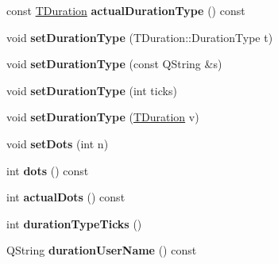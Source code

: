 \begin{DoxyCompactItemize}
\mbox{\label{class_ms_1_1_chord_rest_a6802d9faa8168c8425b8dcb3d11d2edb}} 
const \hyperlink{class_ms_1_1_t_duration}{T\+Duration} {\bfseries actual\+Duration\+Type} () const
\item 
\mbox{\label{class_ms_1_1_chord_rest_adc6b9aa10c0b149eea492432ceeb3ce3}} 
void {\bfseries set\+Duration\+Type} (T\+Duration\+::\+Duration\+Type t)
\item 
\mbox{\label{class_ms_1_1_chord_rest_a24a3f9e86372a2a3285bbcc4da63e741}} 
void {\bfseries set\+Duration\+Type} (const Q\+String \&s)
\item 
\mbox{\label{class_ms_1_1_chord_rest_a0ca27e9601ab0b09bc923c8b804c15a2}} 
void {\bfseries set\+Duration\+Type} (int ticks)
\item 
\mbox{\label{class_ms_1_1_chord_rest_a557b205722fc2931c9113f5afa6f5f48}} 
void {\bfseries set\+Duration\+Type} (\hyperlink{class_ms_1_1_t_duration}{T\+Duration} v)
\item 
\mbox{\label{class_ms_1_1_chord_rest_a3b39d7d2e1b2c2f11ea0d3522af684af}} 
void {\bfseries set\+Dots} (int n)
\item 
\mbox{\label{class_ms_1_1_chord_rest_a1ebb74b05f781c56e63bbc5ff221d7f3}} 
int {\bfseries dots} () const
\item 
\mbox{\label{class_ms_1_1_chord_rest_a3f2d1ebbf74d49882a656ae4ba4b4389}} 
int {\bfseries actual\+Dots} () const
\item 
\mbox{\label{class_ms_1_1_chord_rest_a8a30824fcca6fcc981d06763b16a22de}} 
int {\bfseries duration\+Type\+Ticks} ()
\item 
\mbox{\label{class_ms_1_1_chord_rest_a1fdcdb771fb576c5ba9bd21cc2ad5e6c}} 
Q\+String {\bfseries duration\+User\+Name} () const
\item 
\mbox{\label{class_ms_1_1_chord_rest_ac50a2989556e5cd55b71ca4c98067492}} 

\end{DoxyCompactItemize}

